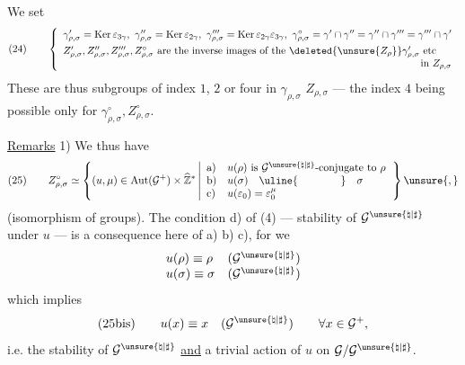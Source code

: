 
We set
\[
(24)\qquad
\left\{
\begin{array}{l}
\gamma'_{\rho,\sigma}=\operatorname{Ker}\varepsilon_{3\gamma},\
\gamma''_{\rho,\sigma}=\operatorname{Ker}\varepsilon_{2\gamma},\
\gamma'''_{\rho,\sigma}=\operatorname{Ker}\varepsilon_{2\gamma}\varepsilon_{3\gamma},\
\gamma^\circ_{\rho,\sigma}=\gamma'\cap\gamma''=\gamma''\cap\gamma'''
=\gamma'''\cap\gamma'\\[4pt]
Z'_{\rho,\sigma},Z''_{\rho,\sigma},Z'''_{\rho,\sigma},Z^\circ_{\rho,\sigma}
\text{ are the inverse images of the }\deleted{\unsure{Z_\rho}}
\gamma'_{\rho,\sigma}\text{ etc}\\
\hfill\text{in }Z_{\rho,\sigma}
\end{array}
\right.
\]
These are thus subgroups of index $1$,  $2$ or four in
$\gamma_{\rho,\sigma}$  $Z_{\rho,\sigma}$ --- the index $4$ being
possible only for $\gamma^\circ_{\rho,\sigma},Z^\circ_{\rho,\sigma}$.

\uline{Remarks} 1) We thus have
\[
(25)\qquad
Z^\circ_{\rho,\sigma}\simeq
\left\{
(u,\mu)\in\operatorname{Aut}(\mathcal{G}^{+})\times\widehat{\mathbb{Z}}^{*}
\left|
\begin{array}{ll}
\mathrm{a})&u(\rho)\text{ is }\mathcal{G}^{\unsure{\natural|\sharp}}\text{-conjugate to }\rho\\
\mathrm{b})&u(\sigma)\quad\uline{\hspace{4em}}\quad\sigma\\
\mathrm{c})&u(\varepsilon_0)=\varepsilon_0^\mu
\end{array}
\right.
\right\}\unsure{,}
\]
(isomorphism of groups). The condition d) of (4) ---
stability of $\mathcal{G}^{\unsure{\natural|\sharp}}$ under $u$ --- is a consequence
here of a) b) c), for we 
\[
\begin{array}{ll}
u(\rho)\equiv\rho&(\mathcal{G}^{\unsure{\natural|\sharp}})\\
u(\sigma)\equiv\sigma&(\mathcal{G}^{\unsure{\natural|\sharp}})
\end{array}
\]
which implies
\[
(25\mathrm{bis})\qquad
u(x)\equiv x\quad(\mathcal{G}^{\unsure{\natural|\sharp}})
\qquad \forall x\in\mathcal{G}^{+},
\]
i.e. the stability of $\mathcal{G}^{\unsure{\natural|\sharp}}$ \uline{and} a trivial action of
$u$ on $\mathcal{G}/\mathcal{G}^{\unsure{\natural|\sharp}}$.

